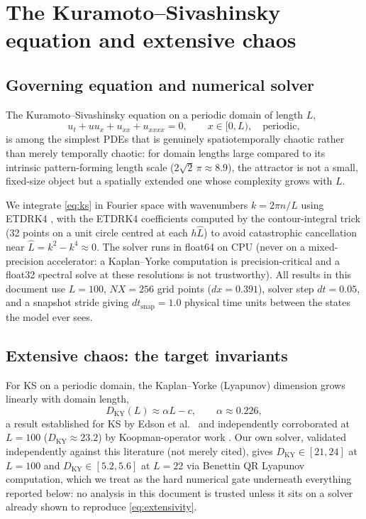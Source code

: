 \documentclass[11pt]{article}
\begin{document}
\tableofcontents

\section{The Kuramoto--Sivashinsky equation and extensive chaos}
\label{sec:ks}

\subsection{Governing equation and numerical solver}

The Kuramoto--Sivashinsky equation on a periodic domain of length $L$,
\begin{equation}
  u_t + u u_x + u_{xx} + u_{xxxx} = 0, \qquad x \in [0, L), \quad \text{periodic},
  \label{eq:ks}
\end{equation}
is among the simplest PDEs that is genuinely spatiotemporally chaotic
rather than merely temporally chaotic: for domain lengths large
compared to its intrinsic pattern-forming length scale
($2\sqrt2\,\pi \approx 8.9$), the attractor is not a small, fixed-size
object but a spatially extended one whose complexity grows with $L$.

We integrate \eqref{eq:ks} in Fourier space with wavenumbers
$k = 2\pi n/L$ using ETDRK4 \cite{kassam2005}, with the ETDRK4
coefficients computed by the contour-integral trick (32 points on a
unit circle centred at each $h\hat L$) to avoid catastrophic
cancellation near $\hat L = k^2 - k^4 \approx 0$. The solver runs in
float64 on CPU (never on a mixed-precision accelerator: a Kaplan--Yorke
computation is precision-critical and a float32 spectral solve at these
resolutions is not trustworthy). All results in this document use
$L=100$, $NX=256$ grid points ($dx = 0.391$), solver step $dt=0.05$,
and a snapshot stride giving $dt_{\mathrm{snap}}=1.0$ physical time
units between the states the model ever sees.

\subsection{Extensive chaos: the target invariants}
\label{sec:extensivity}

For KS on a periodic domain, the Kaplan--Yorke (Lyapunov) dimension
grows linearly with domain length,
\begin{equation}
  D_{\mathrm{KY}}(L) \approx \alpha L - c, \qquad \alpha \approx 0.226,
  \label{eq:extensivity}
\end{equation}
a result established for KS by Edson et al.\ \cite{edson2019} and
independently corroborated at $L=100$ ($D_{\mathrm{KY}} \approx 23.2$)
by Koopman-operator work \cite{koopman1909}. Our own solver, validated
independently against this literature (not merely cited), gives
$D_{\mathrm{KY}} \in [21,24]$ at $L=100$ and $D_{\mathrm{KY}} \in
[5.2,5.6]$ at $L=22$ via Benettin QR Lyapunov computation, which we
treat as the hard numerical gate underneath everything reported below:
no analysis in this document is trusted unless it sits on a solver
already shown to reproduce \eqref{eq:extensivity}.
\end{document}
